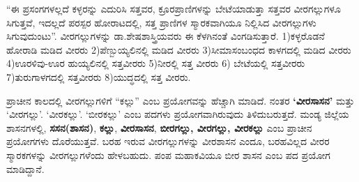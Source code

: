 “ಈ ಪ್ರಸಂಗಗಳಲ್ಲದೆ ಕಳ್ಳರನ್ನು ಎದುರಿಸಿ ಸತ್ತವರ, ಕ್ರೂರಪ್ರಾಣಿಗಳನ್ನು ಬೇಟೆಯಾಡುತ್ತಾ ಸತ್ತವರ ವೀರಗಲ್ಲುಗಳೂ ಸಿಗುತ್ತವೆ, ಇದಲ್ಲದೆ ಪರಸ್ಪರ ಹೋರಾಟದಲ್ಲಿ, ಸತ್ತ ಪ್ರಾಣಿಗಳ ಸ್ಮಾರಕವಾಗಿಯೂ ನಿಲ್ಲಿಸಿದ ವೀರಗಲ್ಲುಗಳು ಸಿಗುವುದುಂಟು”. ವೀರಗಲ್ಲುಗಳನ್ನು ಡಾ.ಶೇಷಶಾಸ್ತ್ರಿಯವರು ಈ ಕೆಳಗಿನಂತೆ ವಿಂಗಡಿಸುತ್ತಾರೆ. 1)ಕಳ್ಳರೊಡನೆ ಹೋರಾಡಿ ಮಡಿದ ವೀರರು 2)ಪೆಣ್ಬುಯ್ಯಲಿನಲ್ಲಿ ಮಡಿದ ವೀರರು 3)ಸೀಮಾಸಂಬಂಧದ ಕಾಳಗದಲ್ಲಿ ಮಡಿದ ವೀರರು 4)ಊರಳಿವು-ಊರ ಹುಯ್ಯಲಿನಲ್ಲಿ ಸತ್ತವೀರರು 5)ನೀರಲ್ಲಿ ಸತ್ತ ವೀರರು 6) ಬೇಟೆಯಲ್ಲಿ ಸತ್ತವೀರರು 7)ತುರುಗಾಳಗದಲ್ಲಿ ಸತ್ತವೀರರು 8)ಯುದ್ಧದಲ್ಲಿ ಸತ್ತ ವೀರರು.

ಪ್ರಾಚೀನ ಕಾಲದಲ್ಲಿ ವೀರಗಲ್ಲುಗಳಿಗೆ “ಕಲ್ಲು” ಎಂಬ ಪ್ರಯೋಗವನ್ನು ಹೆಚ್ಚಾಗಿ ಮಾಡಿದೆ. ನಂತರ \textbf{‘ವೀರಸಾಸನ’} ಮತ್ತು ‘ವೀರಗಲ್ಲು’. ‘ವೀರಕಲ್ಲು’. ‘ಬೀರಕಲ್ಲು’ ಎಂಬ ಪದಗಳು ಪ್ರಯೋಗವಾಗಿರುವುದು ತಿಳಿದುಬರುತ್ತದೆ. ಮಂಡ್ಯ ಜಿಲ್ಲೆಯ ಶಾಸನಗಳಲ್ಲಿ, \textbf{ಸಸನ(ಶಾಸನ)}, \textbf{ಕಲ್ಲು}, \textbf{ವೀರಸಾಸನ}, \textbf{ಬೀರಗಲ್ಲು, ವೀರಗಲ್ಲು, ವೀರಕಲ್ಲು} ಎಂಬ ಪ್ರಾಚೀನ ಪ್ರಯೋಗಗಳು ದೊರೆಯುತ್ತವೆ. ಬರಹ ಇರುವ ವೀರಗಲ್ಲುಗಳನ್ನು ವೀರಶಾಸನ ಎಂದೂ, ಬರಹವಿಲ್ಲದ ವೀರರ ಸ್ಮಾರಕಗಳನ್ನು ವೀರಗಲ್ಲುಗಳೆಂದು ಹೇಳಬಹುದು. ಪಂಪ ಮಹಾಕವಿಯೂ ಬೀರ ಶಾಸನ ಎಂಬ ಪದ ಪ್ರಯೋಗ ಮಾಡಿದ್ದಾನೆ.

